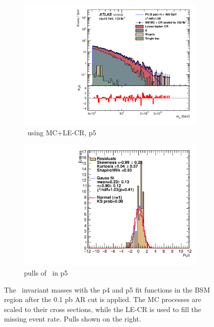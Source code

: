 \begin{figure}[ht]
\begin{subfigure}[h]{0.38\linewidth}
    \includegraphics[scale=0.3]{figs/ch6/fit/variable_nosmooth/p5/01PB/output_SMMCplusCR_Mje_p5.pdf}%
     \caption{\mje \ using MC+LE-CR, p5}
     \end{subfigure}
     \hfill
    \begin{subfigure}[h]{0.4\linewidth}
    \includegraphics[scale=0.32]{figs/ch6/fit/variable_nosmooth/p5/01PB/pull_SMMCplusCR_Mje_p5.pdf}%
    \caption{pulls of \mje \ in p5}
    \end{subfigure}
    \caption{The \mje \ invariant masses with the p4 and p5 fit functions in the BSM region after the 0.1 pb AR cut is applied. The MC processes are scaled to their cross sections, while the LE-CR is used to fill the missing event rate. Pulls shown on the right.}
\label{fig:mje-fit-pulls-01pb}
\end{figure}

